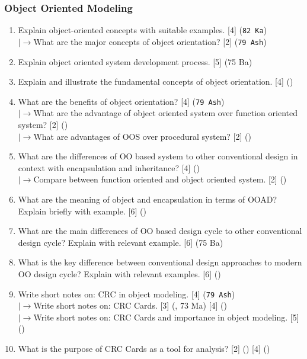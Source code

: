 \documentclass[12pt]{article}
\newcommand{\lb}{\\$\left|\rightarrow\right.$}
\begin{document}
    \subsubsection{Object Oriented Modeling}
      \begin{enumerate}
        \item Explain object-oriented concepts with suitable examples. \hfill [4] (\texttt{82 Ka})
        \lb What are the major concepts of object orientation? \hfill [2] (\texttt{79 Ash})

        \item Explain object oriented system development process. \hfill [5] (75 Ba)

        \item Explain and illustrate the fundamental concepts of object orientation. \hfill [4] ()

        \item What are the benefits of object orientation? \hfill [4] (\texttt{79 Ash})
          \lb What are the advantage of object oriented system over function oriented system? \hfill [2] ()
          \lb What are advantages of OOS over procedural system? \hfill [2] ()

        \item What are the differences of OO based system to other conventional design in context with encapsulation and inheritance? \hfill [4] ()
          \lb Compare between function oriented and object oriented system. \hfill [2] ()

        \item What are the meaning of object and encapsulation in terms of OOAD? Explain briefly with example. \hfill [6] ()

        \item What are the main differences of OO based design cycle to other conventional design cycle? Explain with relevant example. \hfill [6] (75 Ba)

        \item What is the key difference between conventional design approaches to modern OO design cycle? Explain with relevant examples. \hfill [6] ()

        \item Write short notes on: CRC in object modeling. \hfill [4] (\texttt{79 Ash})
          \lb Write short notes on: CRC Cards. \hfill [3] (, 73 Ma) [4] ()
          \lb Write short notes on: CRC Cards and importance in object modeling. \hfill [5] ()

        \item What is the purpose of CRC Cards as a tool for analysis? \hfill [2] () [4] ()
      \end{enumerate}
\end{document}
